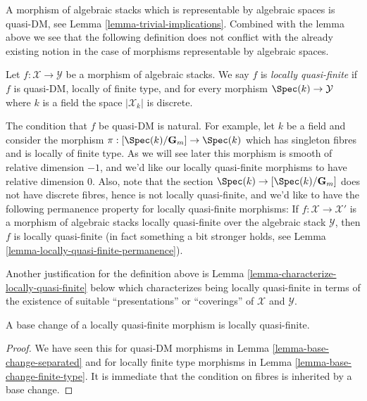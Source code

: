 \noindent
A morphism of algebraic stacks which is representable by algebraic spaces
is quasi-DM, see
Lemma \ref{lemma-trivial-implications}.
Combined with the lemma above we see that the following definition
does not conflict with the already existing notion in the case
of morphisms representable by algebraic spaces.

\begin{definition}
\label{definition-locally-quasi-finite}
Let $f : \mathcal{X} \to \mathcal{Y}$ be a morphism of algebraic stacks.
We say $f$ is {\it locally quasi-finite} if $f$ is quasi-DM, locally of
finite type, and for every morphism $\Spec(k) \to \mathcal{Y}$
where $k$ is a field the space $|\mathcal{X}_k|$ is discrete.
\end{definition}

\noindent
The condition that $f$ be quasi-DM is natural. For example, let $k$ be
a field and consider the morphism
$\pi : [\Spec(k)/\mathbf{G}_m] \to \Spec(k)$
which has singleton fibres and is locally of finite type. As we will see
later this morphism is smooth of relative dimension $-1$, and we'd
like our locally quasi-finite morphisms to have relative dimension $0$.
Also, note that the section $\Spec(k) \to [\Spec(k)/\mathbf{G}_m]$
does not have discrete fibres, hence is not locally quasi-finite, and we'd
like to have the following permanence property for locally quasi-finite
morphisms: If $f : \mathcal{X} \to \mathcal{X}'$ is a morphism of algebraic
stacks locally quasi-finite over the algebraic stack $\mathcal{Y}$, then
$f$ is locally quasi-finite (in fact something a bit stronger holds, see
Lemma \ref{lemma-locally-quasi-finite-permanence}).

\medskip\noindent
Another justification for the definition above is
Lemma \ref{lemma-characterize-locally-quasi-finite}
below which characterizes being locally quasi-finite in terms of the
existence of suitable ``presentations'' or ``coverings'' of
$\mathcal{X}$ and $\mathcal{Y}$.

\begin{lemma}
\label{lemma-base-change-locally-quasi-finite}
A base change of a locally quasi-finite morphism is locally quasi-finite.
\end{lemma}

\begin{proof}
We have seen this for quasi-DM morphisms in
Lemma \ref{lemma-base-change-separated}
and for locally finite type morphisms in
Lemma \ref{lemma-base-change-finite-type}.
It is immediate that the condition on fibres is inherited by a base change.
\end{proof}

